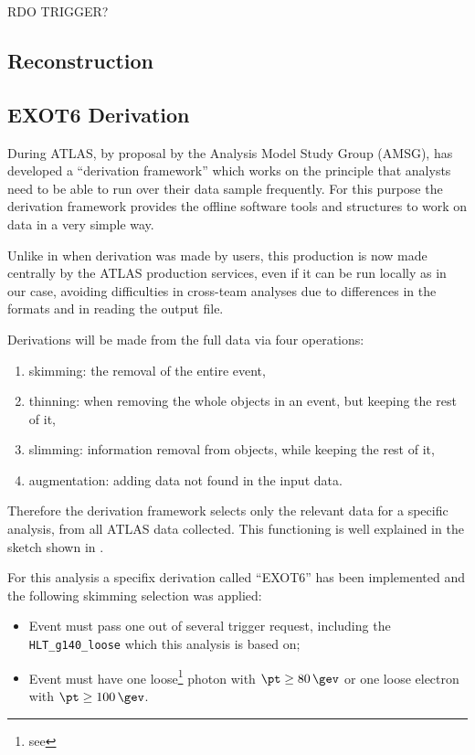 RDO TRIGGER?

\subsection{Reconstruction}
\subsection{EXOT6 Derivation}
During \RunTwo ATLAS, by proposal by the Analysis Model Study Group (AMSG), has developed a ``derivation framework'' which works on the principle that analysts need to be able to run over their data sample frequently. For this purpose the derivation framework provides the offline software tools and structures to work on data in a very simple way. 

Unlike in \RunOne when derivation was made by users, this production is now made centrally by the ATLAS production services, even if it can be run locally as in our case, avoiding difficulties in cross-team analyses due to differences in the formats and in reading the output file.

Derivations will be made from the full data via four operations:
\begin{enumerate}
\item skimming: the removal of the entire event,
\item thinning: when removing the whole objects in an event, but keeping the rest of it,
\item slimming: information removal from objects, while keeping the rest of it,
\item augmentation: adding data not found in the input data.
\end{enumerate}

Therefore the derivation framework selects only the relevant data for a specific analysis, from all ATLAS data collected. This functioning is well explained in the sketch shown in \Fig{\ref{fig:derivation}}.

For this analysis a specifix derivation called ``EXOT6'' has been implemented and the following skimming selection was applied:
\begin{itemize}
\item Event must pass one out of several trigger request, including the \verb!HLT_g140_loose! which this analysis is based on;
\item Event must have one loose\footnote{see \Sect{\ref{photons}}} photon with $\pt\ge\SI{80}{\gev}$ or one loose electron with $\pt\ge\SI{100}{\gev}$.
\end{itemize}
\label{sec:derivation}

